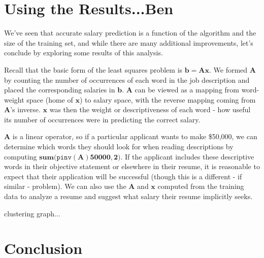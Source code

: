 \documentclass[12pt]{article}
\begin{document}
\section{Using the Results...Ben}
We've seen that accurate salary prediction is a function of the algorithm and the size of the training set, and while there are many additional improvements, let's conclude by exploring some results of this analysis.

Recall that the basic form of the least squares problem is $\bm{b = Ax}$.  We
formed $\bm{A}$ by counting the number of occurrences of each word in the job
description and placed the corresponding salaries in $\bm{b}$.  $\bm{A}$ can be
viewed as a mapping from word-weight space (home of $\bm{x}$) to salary space,
with the reverse mapping coming from $\bm{A}$'s inverse.  $\bm{x}$ was then the
weight or descriptiveness of each word - how useful its number of occurrences
were in predicting the correct salary.

$\bm{A}$ is a linear operator, so if a particular applicant wants to make
\$50,000, we can determine which words they should look for when reading
descriptions by computing $\bm{sum(}\texttt{pinv}\bm{(A)50000,2)}$.  If the
applicant includes these descriptive words in their objective statement or
elsewhere in their resume, it is reasonable to expect that their application
will be successful (though this is a different - if similar - problem).  We can
also use the $\bm{A}$ and $\bm{x}$ computed from the training data to analyze a
resume and suggest what salary their resume implicitly seeks.

clustering graph...



\section{Conclusion}
\end{document}
